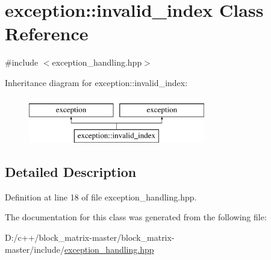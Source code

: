 \hypertarget{classexception_1_1invalid__index}{}\section{exception\+:\+:invalid\+\_\+index Class Reference}
\label{classexception_1_1invalid__index}


{\ttfamily \#include $<$exception\+\_\+handling.\+hpp$>$}

Inheritance diagram for exception\+:\+:invalid\+\_\+index\+:\begin{figure}[H]
\begin{center}
\leavevmode
\includegraphics[height=2.000000cm]{classexception_1_1invalid__index}
\end{center}
\end{figure}


\subsection{Detailed Description}


Definition at line 18 of file exception\+\_\+handling.\+hpp.



The documentation for this class was generated from the following file\+:\begin{DoxyCompactItemize}
\item 
D\+:/c++/block\+\_\+matrix-\/master/block\+\_\+matrix-\/master/include/\mbox{\hyperlink{include_2exception__handling_8hpp}{exception\+\_\+handling.\+hpp}}\end{DoxyCompactItemize}
